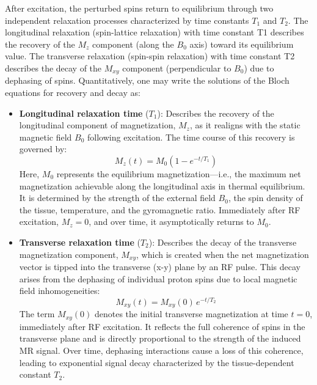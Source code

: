 After excitation, the perturbed spins return to equilibrium through two independent relaxation processes characterized by time constants $T_1$ and $T_2$. The longitudinal relaxation (spin-lattice relaxation) with time constant T1 describes the recovery of the $M_z$ component (along the $B_0$ axis) toward its equilibrium value. The transverse relaxation (spin-spin relaxation) with time constant T2 describes the decay of the $M_{xy}$ component (perpendicular to $B_0$) due to dephasing of spins. Quantitatively, one may write the solutions of the Bloch equations for recovery and decay as:
\begin{itemize}
    \item \textbf{Longitudinal relaxation time} (\(T_1\)): Describes the recovery of the longitudinal component of magnetization, \(M_z\), as it realigns with the static magnetic field \(B_0\) following excitation. The time course of this recovery is governed by:
    \begin{equation}
    M_z(t) = M_0 \left(1 - e^{-t/T_1}\right)
    \end{equation}
    Here, \( M_0 \) represents the equilibrium magnetization—i.e., the maximum net magnetization achievable along the longitudinal axis in thermal equilibrium. It is determined by the strength of the external field \(B_0\), the spin density of the tissue, temperature, and the gyromagnetic ratio. Immediately after RF excitation, \(M_z = 0\), and over time, it asymptotically returns to \(M_0\).

    \item \textbf{Transverse relaxation time} (\(T_2\)): Describes the decay of the transverse magnetization component, \(M_{xy}\), which is created when the net magnetization vector is tipped into the transverse (x-y) plane by an RF pulse. This decay arises from the dephasing of individual proton spins due to local magnetic field inhomogeneities:
    \begin{equation}
    M_{xy}(t) = M_{xy}(0) \, e^{-t/T_2}
    \end{equation}
    The term \( M_{xy}(0) \) denotes the initial transverse magnetization at time \( t = 0 \), immediately after RF excitation. It reflects the full coherence of spins in the transverse plane and is directly proportional to the strength of the induced MR signal. Over time, dephasing interactions cause a loss of this coherence, leading to exponential signal decay characterized by the tissue-dependent constant \(T_2\).
\end{itemize}

